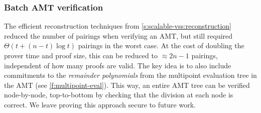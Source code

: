\subsubsection{Batch AMT verification}
\label{s:amt:batch-verification}
The efficient reconstruction techniques from \cref{s:scalable-vss:reconstruction} reduced the number of pairings when verifying an AMT, but still required $\Theta(t + (n-t)\log{t})$ pairings in the worst case.
At the cost of doubling the prover time and proof size, this can be reduced to $\approx 2n-1$ pairings, independent of how many proofs are valid.
The key idea is to also include commitments to the \textit{remainder polynomials} from the multipoint evaluation tree in the AMT (see \cref{f:multipoint-eval}).
This way, an entire AMT tree can be verified node-by-node, top-to-bottom by checking that the division at each node is correct.
We leave proving this approach secure to future work.
